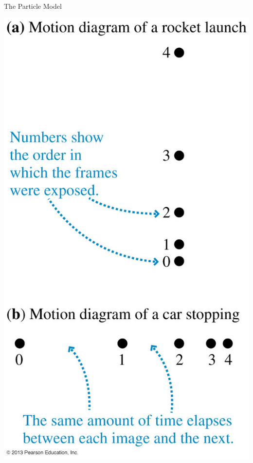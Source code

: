 \documentclass{beamer}
\begin{document}
\begin{frame}{The Particle Model}
\begin{center}
   \includegraphics[height=0.9\textheight]{../figures/01_04_Figure.jpg}
\end{center}
\end{frame}
\end{document}
